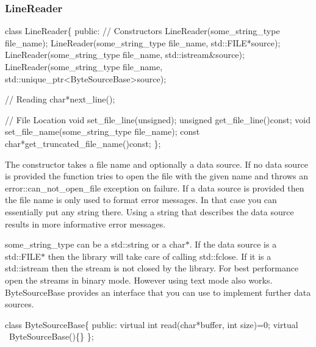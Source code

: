 \subsubsection*{{\ttfamily Line\+Reader}}


\begin{DoxyCode}
\textcolor{keyword}{class }LineReader\{
\textcolor{keyword}{public}:
  \textcolor{comment}{// Constructors}
  LineReader(some\_string\_type file\_name);
  LineReader(some\_string\_type file\_name, std::FILE*source);
  LineReader(some\_string\_type file\_name, std::istream&source);
  LineReader(some\_string\_type file\_name, std::unique\_ptr<ByteSourceBase>source);

  \textcolor{comment}{// Reading}
  \textcolor{keywordtype}{char}*next\_line();

  \textcolor{comment}{// File Location}
  \textcolor{keywordtype}{void} set\_file\_line(\textcolor{keywordtype}{unsigned});
  \textcolor{keywordtype}{unsigned} get\_file\_line()\textcolor{keyword}{const};
  \textcolor{keywordtype}{void} set\_file\_name(some\_string\_type file\_name);
  \textcolor{keyword}{const} \textcolor{keywordtype}{char}*get\_truncated\_file\_name()\textcolor{keyword}{const};
\};
\end{DoxyCode}


The constructor takes a file name and optionally a data source. If no data source is provided the function tries to open the file with the given name and throws an {\ttfamily error\+::can\+\_\+not\+\_\+open\+\_\+file exception} on failure. If a data source is provided then the file name is only used to format error messages. In that case you can essentially put any string there. Using a string that describes the data source results in more informative error messages.

{\ttfamily some\+\_\+string\+\_\+type} can be a {\ttfamily std\+::string} or a {\ttfamily char$\ast$}. If the data source is a {\ttfamily std\+::\+F\+I\+LE$\ast$} then the library will take care of calling {\ttfamily std\+::fclose}. If it is a {\ttfamily std\+::istream} then the stream is not closed by the library. For best performance open the streams in binary mode. However using text mode also works. {\ttfamily Byte\+Source\+Base} provides an interface that you can use to implement further data sources.


\begin{DoxyCode}
\textcolor{keyword}{class }ByteSourceBase\{
\textcolor{keyword}{public}:
  \textcolor{keyword}{virtual} \textcolor{keywordtype}{int} read(\textcolor{keywordtype}{char}*buffer, \textcolor{keywordtype}{int} size)=0;
  \textcolor{keyword}{virtual} ~ByteSourceBase()\{\}
\};
\end{DoxyCode}


